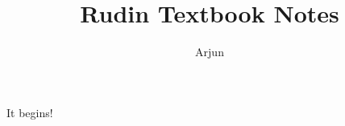 \documentclass{article}
\title{Rudin Textbook Notes}
\author{Arjun}
\begin{document}
\maketitle
 It begins!
\end{document}
